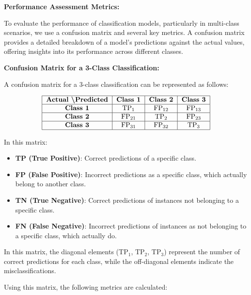 \textbf{Performance Assessment Metrics:}

To evaluate the performance of classification models, particularly in multi-class scenarios, we use a confusion matrix and several key metrics. A confusion matrix provides a detailed breakdown of a model's predictions against the actual values, offering insights into its performance across different classes.

\textbf{Confusion Matrix for a 3-Class Classification:}

A confusion matrix for a 3-class classification can be represented as follows:

\[
\begin{tabular}{|c|c|c|c|}
\hline
\textbf{Actual \textbackslash Predicted} & \textbf{Class 1} & \textbf{Class 2} & \textbf{Class 3} \\
\hline
\textbf{Class 1} & $\text{TP}_{1}$ & $\text{FP}_{12}$ & $\text{FP}_{13}$ \\
\hline
\textbf{Class 2} & $\text{FP}_{21}$ & $\text{TP}_{2}$ & $\text{FP}_{23}$ \\
\hline
\textbf{Class 3} & $\text{FP}_{31}$ & $\text{FP}_{32}$ & $\text{TP}_{3}$ \\
\hline
\end{tabular}
\]

In this matrix:
\begin{itemize}
    \item \textbf{TP (True Positive)}: Correct predictions of a specific class.
    \item \textbf{FP (False Positive)}: Incorrect predictions as a specific class, which actually belong to another class.
    \item \textbf{TN (True Negative)}: Correct predictions of instances not belonging to a specific class.
    \item \textbf{FN (False Negative)}: Incorrect predictions of instances as not belonging to a specific class, which actually do.
\end{itemize}

In this matrix, the diagonal elements ($\text{TP}_{1}$, $\text{TP}_{2}$, $\text{TP}_{3}$) represent the number of correct predictions for each class, while the off-diagonal elements indicate the misclassifications.

Using this matrix, the following metrics are calculated:

